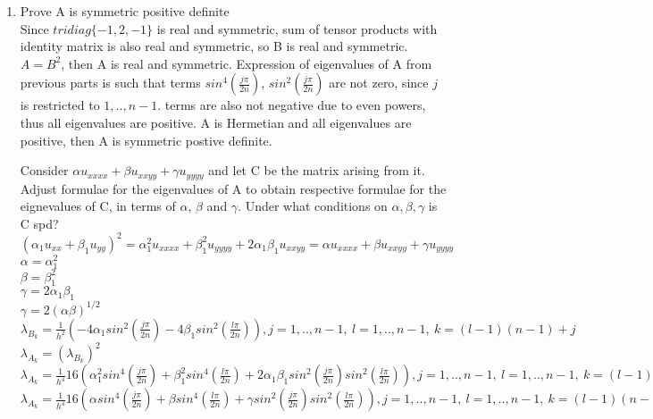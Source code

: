 \documentclass[12pt,letter]{article}
\begin{document}
\begin{enumerate}
\begin{enumerate}
  \item Prove A is symmetric positive definite\\

    Since $tridiag\{-1,2,-1\}$ is real and symmetric, sum of tensor products with identity matrix is also real and symmetric, so B is real and symmetric. $A=B^2$, then A is real and symmetric. Expression of eigenvalues of A from previous parts is such that terms $sin^4(\frac{j \pi}{2n})$, $sin^2(\frac{j \pi}{2n})$ are not zero, since $j$ is restricted to $1,..,n-1$. terms are also not negative due to even powers, thus all eigenvalues are positive. A is Hermetian and all eigenvalues are positive, then A is symmetric postive definite.\\

    \pagebreak
    
    Consider $\alpha u_{xxxx} + \beta u_{xxyy} + \gamma u_{yyyy}$ and let C be the matrix arising from it. Adjust formulae for the eigenvalues of A to obtain respective formulae for the eignevalues of C, in terms of $\alpha$, $\beta$ and $\gamma$. Under what conditions on $\alpha, \beta, \gamma$ is C spd?\\

    $(\alpha_1 u_{xx} + \beta_1 u_{yy})^2 = \alpha_1^2 u_{xxxx} + \beta_1^2 u_{yyyy} + 2 \alpha_1 \beta_1 u_{xxyy} = \alpha u_{xxxx} + \beta u_{xxyy} + \gamma u_{yyyy}$\\
    $\alpha = \alpha_1^2$\\
    $\beta = \beta_1^2$\\
    $\gamma = 2 \alpha_1 \beta_1$\\
    $\gamma = 2 (\alpha \beta)^{1/2}$\\

    $\lambda_{B_k} = \frac{1}{h^2}(-4 \alpha_1 sin^2(\frac{j \pi}{2n}) -4 \beta_1  sin^2(\frac{l \pi}{2n})), j=1,..,n-1,\ l=1,..,n-1,\ k=(l-1)(n-1)+j$\\
    
    $\lambda_{A_k} = (\lambda_{B_k})^2$\\
    $\lambda_{A_k} = \frac{1}{h^4}16( \alpha_1^2 sin^4(\frac{j \pi}{2n}) + \beta_1^2 sin^4(\frac{l \pi}{2n}) +2 \alpha_1 \beta_1 sin^2(\frac{j \pi}{2n})sin^2(\frac{l \pi}{2n}) ), j=1,..,n-1,\ l=1,..,n-1,\ k=(l-1)(n-1)+j$\\
    $\lambda_{A_k} = \frac{1}{h^4}16( \alpha sin^4(\frac{j \pi}{2n}) + \beta sin^4(\frac{l \pi}{2n}) + \gamma  sin^2(\frac{j \pi}{2n})sin^2(\frac{l \pi}{2n}) ), j=1,..,n-1,\ l=1,..,n-1,\ k=(l-1)(n-1)+j$\\


\end{enumerate}
\end{enumerate}
\end{document}
